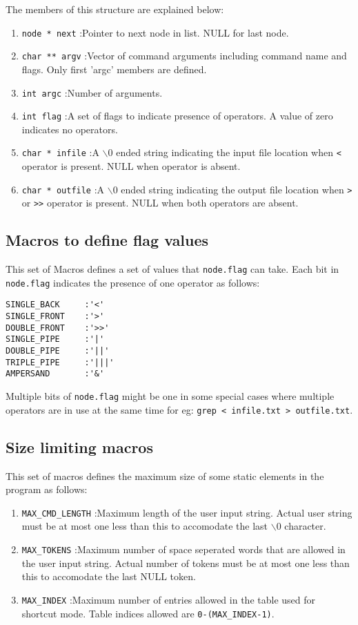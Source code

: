 \documentclass{article}
\begin{document}
The members of this structure are explained below:
\begin{enumerate}
	\item \lstinline{node * next} :Pointer to next node in list. NULL for last node.
	\item \lstinline{char ** argv} :Vector of command arguments including command name and flags. Only first 'argc' members are defined.
	\item \lstinline{int argc} :Number of arguments.
	\item \lstinline{int flag} :A set of flags to indicate presence of operators. A value of zero indicates no operators.
	\item \lstinline{char * infile} :A $\backslash$0 ended string indicating the input file location when \lstinline{<} operator is present. NULL when operator is absent.
	\item \lstinline{char * outfile} :A $\backslash$0 ended string indicating the output file location when \lstinline{>} or \lstinline{>>} operator is present. NULL when both operators are absent.
\end{enumerate}


\subsection{Macros to define flag values}

This set of Macros defines a set of values that \lstinline{node.flag} can take. Each bit in \lstinline{node.flag} indicates the presence of one operator as follows:
\begin{lstlisting}
SINGLE_BACK 	:'<'
SINGLE_FRONT	:'>'
DOUBLE_FRONT	:'>>'
SINGLE_PIPE 	:'|'
DOUBLE_PIPE 	:'||'
TRIPLE_PIPE 	:'|||'
AMPERSAND 		:'&'
\end{lstlisting}
Multiple bits of \lstinline{node.flag} might be one in some special cases where multiple operators are in use at the same time for eg: \lstinline{grep < infile.txt > outfile.txt}.


\subsection{Size limiting macros}

This set of macros defines the maximum size of some static elements in the program as follows:
\begin{enumerate}
	\item \lstinline{MAX_CMD_LENGTH} :Maximum length of the user input string. Actual user string must be at most one less than this to accomodate the last $\backslash$0 character.
	\item \lstinline{MAX_TOKENS} :Maximum number of space seperated words that are allowed in the user input string. Actual number of tokens must be at most one less than this to accomodate the last NULL token.
	\item \lstinline{MAX_INDEX} :Maximum number of entries allowed in the table used for shortcut mode. Table indices allowed are \lstinline{0-(MAX_INDEX-1)}.
\end{enumerate}
\end{document}
